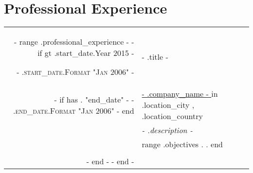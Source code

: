 \section{Professional Experience}
\begin{tabular}{r|p{15cm}}
    {{- range .professional_experience -}}
    {{- if gt .start_date.Year 2015 -}}

    \textsc{ {{- .start_date.Format "Jan 2006" -}} }                                    & {{- .title -}}                                                                                          \\
    {{- if has . "end_date" -}}\textsc{ {{- .end_date.Format "Jan 2006" -}} } {{ end }} & \href{ {{- .company_url -}} }{ {{- .company_name -}} } in {{ .location_city }}, {{ .location_country }} \\
                                                                                        & \emph{ {{- .description -}} }                                                                           \\
                                                                                        & \footnotesize{ {{ range .objectives }} {{ . }}. {{ end }} }                                             \\
    \multicolumn{2}{c}{}                                                                                                                                                                          \\

    {{- end -}}
    {{- end -}}
\end{tabular}

